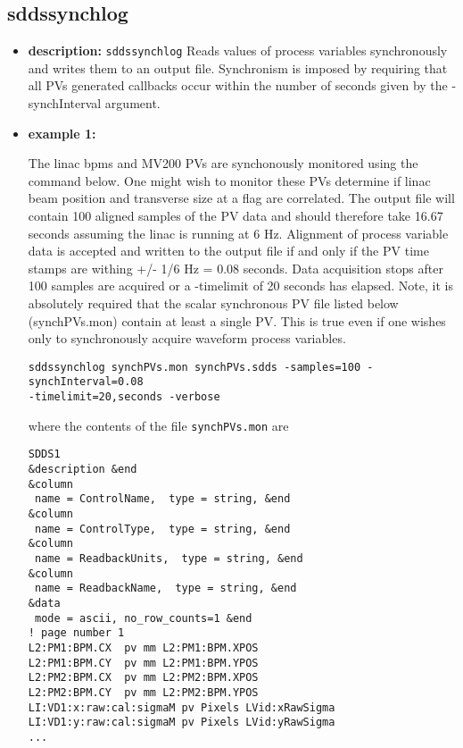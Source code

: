 %
%
\begin{latexonly}
\newpage
\end{latexonly}

%
%
\subsection{sddssynchlog}
\label{sddssynchlog}

\begin{itemize}
\item {\bf description:}
%
%
\verb+sddssynchlog+ Reads values of process variables synchronously
and writes them to an output file.  Synchronism is imposed by
requiring that all PVs generated callbacks occur within the number of
seconds given by the -synchInterval argument.
\item {\bf example 1:} 
%
% 
%

The linac bpms and MV200 PVs are synchonously monitored using the
command below.  One might wish to monitor these PVs determine if linac
beam position and transverse size at a flag are correlated.  The
output file will contain 100 aligned samples of the PV data and should
therefore take 16.67 seconds assuming the linac is running at 6 Hz.
Alignment of process variable data is accepted and written to the
output file if and only if the PV time stamps are withing +/- 1/6 Hz =
0.08 seconds.  Data acquisition stops after 100 samples are acquired
or a -timelimit of 20 seconds has elapsed.  Note, it is absolutely
required that the scalar synchronous PV file listed below
(synchPVs.mon) contain at least a single PV.  This is true even if one
wishes only to synchronously acquire waveform process variables.
\begin{verbatim}
sddssynchlog synchPVs.mon synchPVs.sdds -samples=100 -synchInterval=0.08 
-timelimit=20,seconds -verbose
\end{verbatim}
where the contents of the file \verb+synchPVs.mon+ are
\begin{verbatim}
SDDS1
&description &end
&column
 name = ControlName,  type = string, &end
&column
 name = ControlType,  type = string, &end
&column
 name = ReadbackUnits,  type = string, &end
&column
 name = ReadbackName,  type = string, &end
&data
 mode = ascii, no_row_counts=1 &end
! page number 1
L2:PM1:BPM.CX  pv mm L2:PM1:BPM.XPOS 
L2:PM1:BPM.CY  pv mm L2:PM1:BPM.YPOS 
L2:PM2:BPM.CX  pv mm L2:PM2:BPM.XPOS 
L2:PM2:BPM.CY  pv mm L2:PM2:BPM.YPOS 
LI:VD1:x:raw:cal:sigmaM pv Pixels LVid:xRawSigma 
LI:VD1:y:raw:cal:sigmaM pv Pixels LVid:yRawSigma 
...


\end{verbatim}
\end{itemize}
